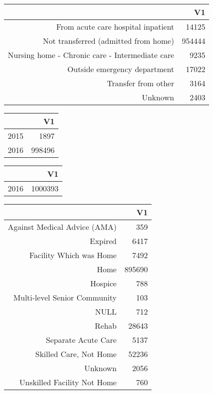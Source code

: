 \bigskip\bigskip
\centering
\begin{tabular}{rr}
  \hline
 & V1 \\ 
  \hline
From acute care hospital inpatient & 14125 \\ 
  Not transferred (admitted from home) & 954444 \\ 
  Nursing home - Chronic care - Intermediate care & 9235 \\ 
  Outside emergency department & 17022 \\ 
  Transfer from other & 3164 \\ 
  Unknown & 2403 \\ 
   \hline
\end{tabular}

\bigskip\bigskip
\centering
\begin{tabular}{rr}
  \hline
 & V1 \\ 
  \hline
2015 & 1897 \\ 
  2016 & 998496 \\ 
   \hline
\end{tabular}

\bigskip\bigskip
\centering
\begin{tabular}{rr}
  \hline
 & V1 \\ 
  \hline
2016 & 1000393 \\ 
   \hline
\end{tabular}

\bigskip\bigskip
\centering
\begin{tabular}{rr}
  \hline
 & V1 \\ 
  \hline
Against Medical Advice (AMA) & 359 \\ 
  Expired & 6417 \\ 
  Facility Which was Home & 7492 \\ 
  Home & 895690 \\ 
  Hospice & 788 \\ 
  Multi-level Senior Community & 103 \\ 
  NULL & 712 \\ 
  Rehab & 28643 \\ 
  Separate Acute Care & 5137 \\ 
  Skilled Care, Not Home & 52236 \\ 
  Unknown & 2056 \\ 
  Unskilled Facility Not Home & 760 \\ 
   \hline
\end{tabular}

